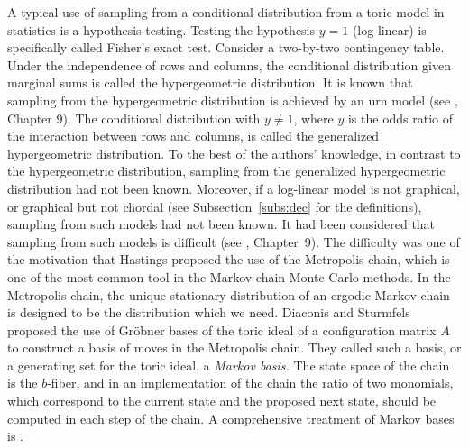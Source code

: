\documentclass[a4paper,12pt]{article}
\theoremstyle{plain}
\theoremstyle{remark}
\newtheorem{definition}[theorem]{Definition}
\begin{document}

A typical use of sampling from a conditional distribution
from a toric model in statistics is a hypothesis testing.
Testing the hypothesis $y=1$ (log-linear) is specifically
called Fisher's exact test. Consider a two-by-two contingency
table. Under the independence of rows and columns,
the conditional distribution given marginal sums is called
the hypergeometric distribution. It is known that sampling from
the hypergeometric distribution is achieved by an urn model
(see \cite{Sul18}, Chapter 9). The conditional
distribution with $y\neq 1$, where $y$ is the odds ratio of
the interaction between rows and columns, is called
the generalized hypergeometric distribution. To the best of
the authors' knowledge, in contrast to the hypergeometric
distribution, sampling from the generalized hypergeometric
distribution had not been known. Moreover, if a log-linear model
is not graphical, or graphical but not chordal (see
Subsection~\ref{subs:dec} for the definitions), sampling
from such models had not been known. It had been considered
that sampling from such models is difficult
(see \cite{Sul18}, Chapter~9). The difficulty was one of
the motivation that Hastings \cite{Has70} proposed the use
of the Metropolis chain, which is one of the most common
tool in the Markov chain Monte Carlo methods.
In the Metropolis chain, the unique stationary distribution
of an ergodic Markov chain is designed to be the distribution
which we need. Diaconis and Sturmfels \cite{DS98} proposed
the use of Gr\"obner bases of the toric ideal of a configuration
matrix $A$ to construct a basis of moves in the Metropolis
chain. They called such a basis, or a generating set for
the toric ideal, a {\it Markov basis.} The state space of
the chain is the $b$-fiber, and in an implementation of
the chain the ratio of two monomials, which correspond to
the current state and the proposed next state, should be
computed in each step of the chain. A comprehensive treatment
of Markov bases is \cite{AHT12}.
\end{document}
